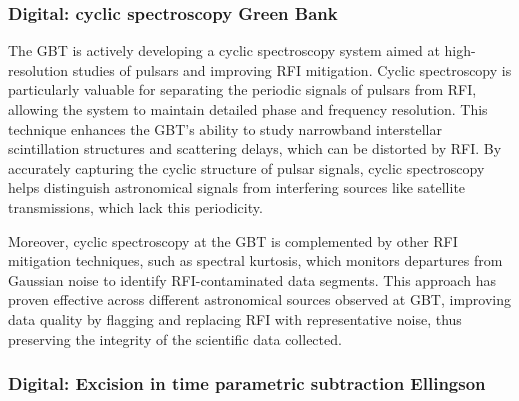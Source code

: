 
\subsubsection{Digital: cyclic spectroscopy Green Bank}

The GBT is actively developing a cyclic spectroscopy system aimed at high-resolution studies of pulsars and improving RFI mitigation. Cyclic spectroscopy is particularly valuable for separating the periodic signals of pulsars from RFI, allowing the system to maintain detailed phase and frequency resolution. This technique enhances the GBT’s ability to study narrowband interstellar scintillation structures and scattering delays, which can be distorted by RFI. By accurately capturing the cyclic structure of pulsar signals, cyclic spectroscopy helps distinguish astronomical signals from interfering sources like satellite transmissions, which lack this periodicity.

Moreover, cyclic spectroscopy at the GBT is complemented by other RFI mitigation techniques, such as spectral kurtosis, which monitors departures from Gaussian noise to identify RFI-contaminated data segments. This approach has proven effective across different astronomical sources observed at GBT, improving data quality by flagging and replacing RFI with representative noise, thus preserving the integrity of the scientific data collected.

\subsubsection{Digital: Excision in time parametric subtraction Ellingson}

